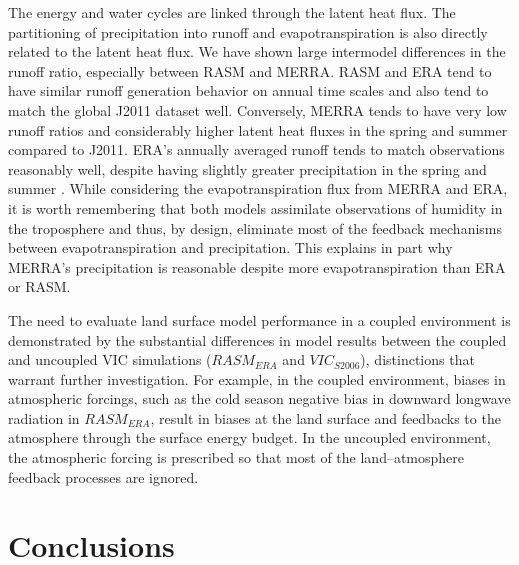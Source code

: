 The energy and water cycles are linked through the latent heat flux.
The partitioning of precipitation into runoff and evapotranspiration is also directly related to the latent heat flux.
We have shown large intermodel differences in the runoff ratio, especially between RASM and MERRA.
RASM and ERA tend to have similar runoff generation behavior on annual time scales and also tend to match the global J2011 dataset well.
Conversely, MERRA tends to have very low runoff ratios and considerably higher latent heat fluxes in the spring and summer compared to J2011.
ERA’s annually averaged runoff tends to match observations reasonably well, despite having slightly greater precipitation in the spring and summer \citep[see Fig. \ref{fig:streamflow_scatter} herein; ][]{Lindsay_2014}.
While considering the evapotranspiration flux from MERRA and ERA, it is worth remembering that both models assimilate observations of humidity in the troposphere and thus, by design, eliminate most of the feedback mechanisms between evapotranspiration and precipitation.
This explains in part why MERRA’s precipitation is reasonable despite more evapotranspiration than ERA or RASM.

The need to evaluate land surface model performance in a coupled environment is demonstrated by the substantial differences in model results between the coupled and uncoupled VIC simulations ($RASM_{ERA}$ and $VIC_{S2006}$), distinctions that warrant further investigation.
For example, in the coupled environment, biases in atmospheric forcings, such as the cold season negative bias in downward longwave radiation in $RASM_{ERA}$, result in biases at the land surface and feedbacks to the atmosphere through the surface energy budget.
In the uncoupled environment, the atmospheric forcing is prescribed so that most of the land–atmosphere feedback processes are ignored.

\section{Conclusions}
\label{sec:conclusions_ch3}


